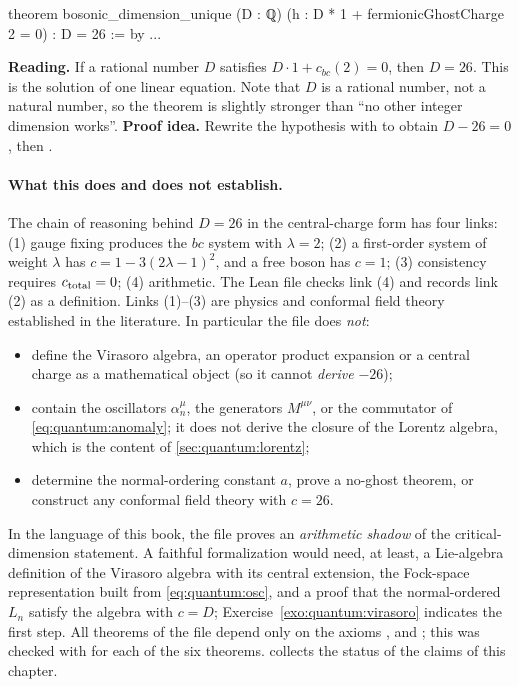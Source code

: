\begin{leanbox}
\begin{leancode}
theorem bosonic_dimension_unique (D : ℚ)
    (h : D * 1 + fermionicGhostCharge 2 = 0) :
    D = 26 := by ...
\end{leancode}
\textbf{Reading.} If a rational number $D$ satisfies $D\cdot1+c_{bc}(2)=0$, then $D=26$. This
is the solution of one linear equation. Note that $D$ is a rational number, not a natural
number, so the theorem is slightly stronger than ``no other integer dimension works''.
\textbf{Proof idea.} Rewrite the hypothesis with  to obtain
$D-26=0$, then .
\end{leanbox}

\paragraph{What this does and does not establish.} The chain of reasoning behind $D=26$ in
the central-charge form has four links: (1) gauge fixing produces the $bc$ system with
$\lambda=2$; (2) a first-order system of weight $\lambda$ has $c=1-3(2\lambda-1)^2$, and a
free boson has $c=1$; (3) consistency requires $c_{\rm total}=0$; (4) arithmetic. The Lean
file checks link (4) and records link (2) as a definition. Links (1)--(3) are physics and
conformal field theory established in the literature. In particular the file does
\emph{not}:
\begin{itemize}[leftmargin=*]
\item define the Virasoro algebra, an operator product expansion or a central charge as a
mathematical object (so it cannot \emph{derive} $-26$);
\item contain the oscillators $\alpha^\mu_n$, the generators $M^{\mu\nu}$, or the commutator
of \cref{eq:quantum:anomaly}; it does not derive the closure of the Lorentz algebra, which is
the content of \cref{sec:quantum:lorentz};
\item determine the normal-ordering constant $a$, prove a no-ghost theorem, or construct
any conformal field theory with $c=26$.
\end{itemize}
In the language of this book, the file proves an \emph{arithmetic shadow} of the
critical-dimension statement. A faithful formalization would need, at least, a Lie-algebra
definition of the Virasoro algebra with its central extension, the Fock-space representation
built from \cref{eq:quantum:osc}, and a proof that the normal-ordered $L_n$ satisfy the
algebra with $c=D$; Exercise~\ref{exo:quantum:virasoro} indicates the first step. All
theorems of the file depend only on the axioms ,  and
; this was checked with  for each of the six theorems.
 collects the status of the claims of this chapter.

